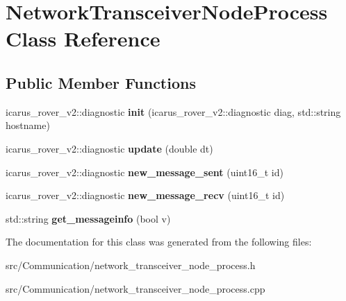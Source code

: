 \hypertarget{classNetworkTransceiverNodeProcess}{}\section{Network\+Transceiver\+Node\+Process Class Reference}
\label{classNetworkTransceiverNodeProcess}
\subsection*{Public Member Functions}
\begin{DoxyCompactItemize}
\item 
\mbox{\label{classNetworkTransceiverNodeProcess_a951a808d45030a0542e1300146063e6e}} 
icarus\+\_\+rover\+\_\+v2\+::diagnostic {\bfseries init} (icarus\+\_\+rover\+\_\+v2\+::diagnostic diag, std\+::string hostname)
\item 
\mbox{\label{classNetworkTransceiverNodeProcess_ac0d56e554ca2bc04d04509d99f3e43f5}} 
icarus\+\_\+rover\+\_\+v2\+::diagnostic {\bfseries update} (double dt)
\item 
\mbox{\label{classNetworkTransceiverNodeProcess_ae66e631a6390fffa15ab136105e04156}} 
icarus\+\_\+rover\+\_\+v2\+::diagnostic {\bfseries new\+\_\+message\+\_\+sent} (uint16\+\_\+t id)
\item 
\mbox{\label{classNetworkTransceiverNodeProcess_ab999463689adcf8d3fecc09d6cf478d1}} 
icarus\+\_\+rover\+\_\+v2\+::diagnostic {\bfseries new\+\_\+message\+\_\+recv} (uint16\+\_\+t id)
\item 
\mbox{\label{classNetworkTransceiverNodeProcess_a44fb5931dda92d60a219156340e0ae49}} 
std\+::string {\bfseries get\+\_\+messageinfo} (bool v)
\end{DoxyCompactItemize}


The documentation for this class was generated from the following files\+:\begin{DoxyCompactItemize}
\item 
src/\+Communication/network\+\_\+transceiver\+\_\+node\+\_\+process.\+h\item 
src/\+Communication/network\+\_\+transceiver\+\_\+node\+\_\+process.\+cpp\end{DoxyCompactItemize}
